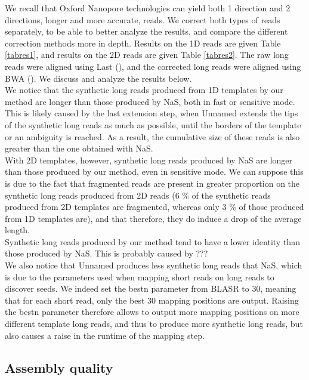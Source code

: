 \documentclass{bioinfo}
\begin{document}
We recall that Oxford Nanopore technologies can yield both 1 direction and 2 directions, longer and more accurate, reads. We correct both types of reads separately, to be able to better analyze the results, and compare the different correction methods more in depth. Results on the 1D reads are given Table \ref{tabres1}, and results on the 2D reads are given Table \ref{tabres2}. The raw long reads were aligned using Last (\cite{Kielbasa2011}), and the corrected long reads were aligned using BWA (\cite{Li2009}). We discuss and analyze the results below. \\
\indent We notice that the synthetic long reads produced from 1D templates by our method are longer than those produced by NaS, both in fast or sensitive mode. This is likely caused by the last extension step, when Unnamed extends the tips of the synthetic long reads as much as possible, until the borders of the template or an ambiguity is reached. As a result, the cumulative size of these reads is also greater than the one obtained with NaS. \\
\indent With 2D templates, however, synthetic long reads produced by NaS are longer than those produced by our method, even in sensitive mode. We can suppose this is due to the fact that fragmented reads are present in greater proportion on the synthetic long reads produced from 2D reads (6 \% of the synthetic reads produced from 2D templates are fragmented, whereas only 3 \% of those produced from 1D templates are), and that therefore, they do induce a drop of the average length. \\
\indent Synthetic long reads produced by our method tend to have a lower identity than those produced by NaS. This is probably caused by ??? \\
\indent We also notice that Unnamed produces less synthetic long reads that NaS, which is due to the parameters used when mapping short reads on long reads
to discover seeds. We indeed set the bestn parameter from BLASR to 30, meaning that for each short read, only the best 30 mapping positions are output. Raising the bestn parameter therefore allows to output more mapping positions on more different template long reads, and thus to produce more synthetic long reads, but also causes a raise in the runtime of the mapping step.

\subsection{Assembly quality}
	
\end{document}
